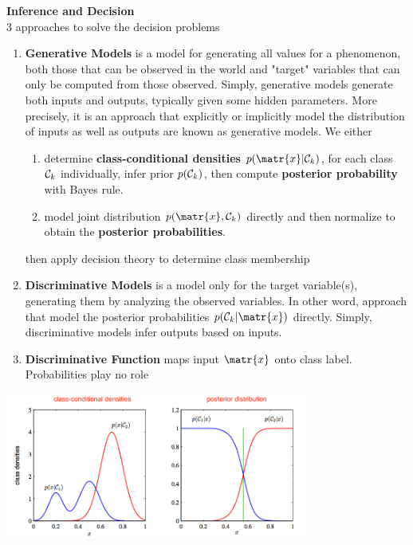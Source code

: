 \documentclass[11pt]{article}
\begin{document}
\begin{defn*}
    \textbf{Inference and Decision} \\
    3 approaches to solve the decision problems 
    \begin{enumerate}
        \item \textbf{Generative Models} is a model for generating all values for a phenomenon, both those that can be observed in the world and "target" variables that can only be computed from those observed. Simply, generative models generate both inputs and outputs, typically given some hidden parameters. More precisely, it is an approach that explicitly or implicitly model the distribution of inputs as well as outputs are known as generative models. We either 
        \begin{enumerate}
            \item determine \textbf{class-conditional densities} $p(\matr{x}|\calC_k)$, for each class $\mathcal{C}_k$ individually, infer prior $p(\mathcal{C}_k)$, then compute \textbf{posterior probability} with Bayes rule.
            \item model joint distribution $p(\matr{x}, \calC_k)$ directly and then normalize to obtain the \textbf{posterior probabilities}.
        \end{enumerate}
        then apply decision theory to determine class membership 
        \item \textbf{Discriminative Models} is a model only for the target variable(s), generating them by analyzing the observed variables. In other word, approach that model the posterior probabilities $p(\calC_k | \matr{x})$ directly. Simply, discriminative models infer outputs based on inputs.
        \item \textbf{Discriminative Function} maps input $\matr{x}$ onto class label. Probabilities play no role
    \end{enumerate}
    \begin{center}
        \includegraphics[width=10cm]{classconditional_vs_posterior.jpg}
    \end{center}
\end{defn*}
\end{document}
